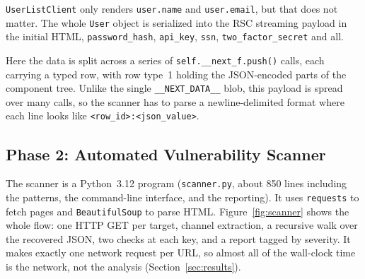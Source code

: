 \documentclass[runningheads]{llncs}
\begin{document}
\texttt{UserListClient} only renders \texttt{user.name} and
\texttt{user.email}, but that does not matter.  The whole \texttt{User}
object is serialized into the RSC streaming payload in the initial HTML,
\texttt{password\_hash}, \texttt{api\_key}, \texttt{ssn},
\texttt{two\_factor\_secret} and all.

Here the data is split across a series of
\texttt{self.\_\_next\_f.push()} calls, each carrying a typed row, with row
type~1 holding the JSON-encoded parts of the component tree.  Unlike the
single \texttt{\_\_NEXT\_DATA\_\_} blob, this payload is spread over many
calls, so the scanner has to parse a newline-delimited format where each
line looks like \texttt{<row\_id>:<json\_value>}.

\subsection{Phase 2: Automated Vulnerability Scanner}

The scanner is a Python~3.12 program (\texttt{scanner.py}, about 850 lines
including the patterns, the command-line interface, and the reporting).
It uses \texttt{requests} to fetch pages and \texttt{BeautifulSoup} to
parse HTML.  Figure~\ref{fig:scanner} shows the whole flow: one HTTP GET
per target, channel extraction, a recursive walk over the recovered JSON,
two checks at each key, and a report tagged by severity.  It makes exactly
one network request per URL, so almost all of the wall-clock time is the
network, not the analysis (Section~\ref{sec:results}).
\end{document}
